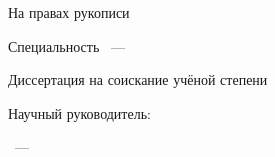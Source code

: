\thispagestyle{empty}%
\begin{center}%
\MakeUppercase{\thesisOrganization}
\end{center}%
%
\vspace{0pt plus4fill} %
\begin{flushright}%
На правах рукописи

\end{flushright}%
%
\vspace{0pt plus6fill} %
\begin{center}%
{\large \thesisAuthor}
\end{center}%
%
\vspace{0pt plus1fill} %
\begin{center}%
\textbf {\large \thesisTitle}

\vspace{0pt plus2fill} %
{%
Специальность \thesisSpecialtyNumber~---

\thesisSpecialtyTitle
}

\vspace{0pt plus2fill} %
Диссертация на соискание учёной степени

\thesisDegree
\end{center}%
%
\vspace{0pt plus4fill} %
\begin{flushright}%
Научный руководитель:

\supervisorRegalia

\supervisorFio
\end{flushright}%
%
\vspace{0pt plus4fill} %
\begin{center}%
{\thesisCity~--- \thesisYear}
\end{center}%
\newpage
